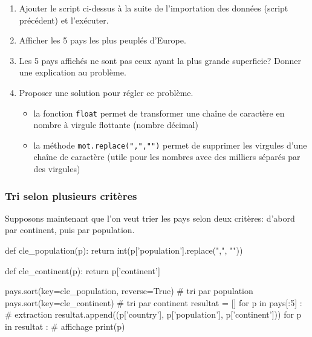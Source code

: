 \begin{exercice_cours}[\quad]{}
\begin{enumerate}
	\item Ajouter le script ci-dessus à la suite de l'importation des données (script précédent) et l'exécuter. 
	\item Afficher les 5 pays les plus peuplés d'Europe.
	\item Les 5 pays affichés ne sont pas ceux ayant la plus grande superficie? Donner une explication au problème.
	\item Proposer une solution pour régler ce problème.

	\begin{remarque}{\quad}{}
\begin{itemize}
	\item la fonction \verb|float| permet de transformer une chaîne de caractère en nombre à virgule flottante (nombre décimal)
	\item la méthode \verb|mot.replace(",","")| permet de supprimer les virgules d'une chaîne de caractère (utile pour les nombres avec des milliers séparés par des virgules)
\end{itemize}
\end{remarque}
	\end{enumerate}

\end{exercice_cours}
\subsubsection{Tri selon plusieurs critères}

 Supposons maintenant que l'on veut trier les pays selon deux critères: d'abord par continent, puis par population.

\begin{CodePythontexAlt}[Largeur=1\linewidth,Centre,PremLigne=1, lineNumbers=false]{}
def cle_population(p):
    return int(p['population'].replace(",", ""))

def cle_continent(p):
    return p['continent']

pays.sort(key=cle_population, reverse=True)  # tri par population
pays.sort(key=cle_continent)                 # tri par continent
resultat = []
for p in pays[:5] : # extraction
	resultat.append((p['country'], p['population'], p['continent']))
for p in resultat : # affichage
    print(p)
\end{CodePythontexAlt}

\medskip

